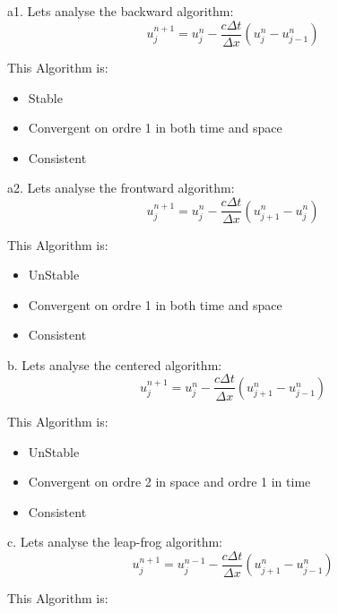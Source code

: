 \documentclass[12pt]{article}
\begin{document}
a1. Lets analyse the backward algorithm:
\begin{equation}
    u_j^{n+1} = u_j^n - \frac{c \Delta t}{\Delta x} \left( u_j^n - u_{j-1}^n \right)
\end{equation}

This Algorithm is:

\begin{itemize}
    \item Stable
    \item Convergent on ordre 1 in both time and space
    \item Consistent\\[1cm]
\end{itemize}


a2. Lets analyse the frontward algorithm:
\begin{equation}
    u_j^{n+1} = u_j^n - \frac{c \Delta t}{\Delta x} \left( u_{j+1}^n - u_{j}^n \right)
\end{equation}

This Algorithm is:

\begin{itemize}
    \item UnStable
    \item Convergent on ordre 1 in both time and space
    \item Consistent\\[1cm]
\end{itemize}

b. Lets analyse the centered algorithm:
\begin{equation}
    u_j^{n+1} = u_j^n - \frac{c \Delta t}{\Delta x} \left( u_{j+1}^n - u_{j-1}^n \right)
\end{equation}

This Algorithm is:

\begin{itemize}
    \item UnStable
    \item Convergent on ordre 2 in space and ordre 1 in time 
    \item Consistent\\[1cm]
\end{itemize}

c. Lets analyse the leap-frog algorithm:
\begin{equation}
    u_j^{n+1} = u_j^{n-1} - \frac{c \Delta t}{\Delta x} \left( u_{j+1}^n - u_{j-1}^n \right)
\end{equation}

This Algorithm is:
\end{document}

